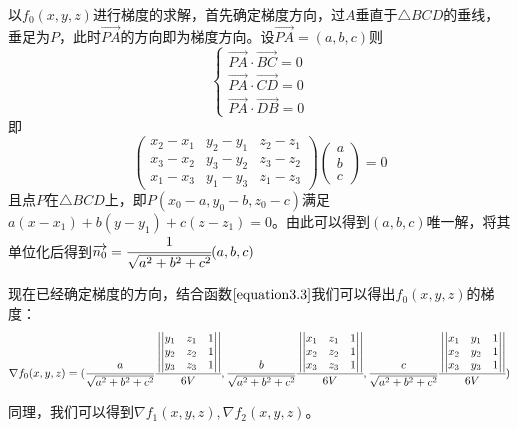 \documentclass[12pt,a4paper]{article}
\begin{document}
以$f_0(x,y,z)$进行梯度的求解，首先确定梯度方向，过$A$垂直于$\triangle BCD$的垂线，垂足为$P$，此时$\overrightarrow {P A}$的方向即为梯度方向。设$\overrightarrow {P A}=(a,b,c)$则$$\begin{cases}\overrightarrow {P A} \cdot \overrightarrow {B C}=0\\ \overrightarrow {P A} \cdot \overrightarrow {C D}=0\\ \overrightarrow {P A} \cdot \overrightarrow {D B}=0
\end{cases}$$
即\begin{equation}
\begin{pmatrix}
x_2-x_1&y_2-y_1&z_2-z_1\\
x_3-x_2&y_3-y_2&z_3-z_2\\
x_1-x_3&y_1-y_3&z_1-z_3
\end{pmatrix}
\begin{pmatrix}
a\\b\\c
\end{pmatrix}=0
\end{equation}
且点$P$在$\triangle BCD$上，即$P(x_0-a,y_0-b,z_0-c)$满足$a(x-x_1)+b(y-y_1)+c(z-z_1)=0$。由此可以得到$(a,b,c)$唯一解，将其单位化后得到$\overrightarrow {n_0}=\cfrac {1}{\sqrt {a^2+b^2+c^2}}(a,b,c)$

现在已经确定梯度的方向，结合函数$\ref{equation3.3}$我们可以得出$f_0(x,y,z)$的梯度：$$\nabla f_0(x,y,z)=(\cfrac {a}{\sqrt {a^2+b^2+c^2}} \cfrac{\left|\begin{vmatrix}
	y_1&z_1&1\\y_2&z_2&1\\y_3&z_3&1
	\end{vmatrix}\right|}{6V},
\cfrac {b}{\sqrt {a^2+b^2+c^2}} \cfrac{\left|\begin{vmatrix}
	x_1&z_1&1\\x_2&z_2&1\\x_3&z_3&1
	\end{vmatrix}\right|}{6V},\cfrac {c}{\sqrt {a^2+b^2+c^2}} \cfrac{\left|\begin{vmatrix}
	x_1&y_1&1\\x_2&y_2&1\\x_3&y_3&1
	\end{vmatrix}\right|}{6V})$$

同理，我们可以得到$\nabla f_1(x,y,z),\nabla f_2(x,y,z)$。
\end{document}

